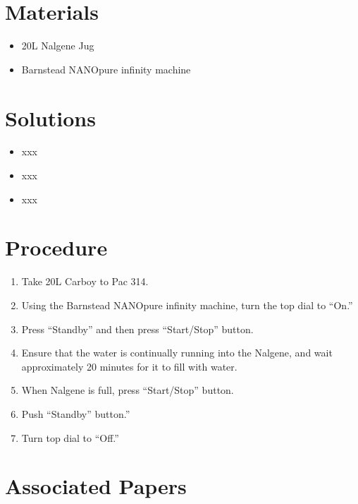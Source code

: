 \documentclass[
  letterpaper,
  DIV=11,
  numbers=noendperiod]{scrreprt}
\providecommand{\tightlist}{%
  \setlength{\itemsep}{0pt}\setlength{\parskip}{0pt}}\usepackage{longtable,booktabs,array}
\begin{document}
\hypertarget{materials-7}{%
\section{Materials}\label{materials-7}}

\begin{itemize}
\tightlist
\item
  20L Nalgene Jug
\item
  Barnstead NANOpure infinity machine
\end{itemize}

\hypertarget{solutions-7}{%
\section{Solutions}\label{solutions-7}}

\begin{itemize}
\tightlist
\item
  xxx
\item
  xxx
\item
  xxx
\end{itemize}

\hypertarget{procedure-7}{%
\section{Procedure}\label{procedure-7}}

\begin{enumerate}
\def\labelenumi{\arabic{enumi}.}
\item
  Take 20L Carboy to Pac 314.
\item
  Using the Barnstead NANOpure infinity machine, turn the top dial to
  ``On.''
\item
  Press ``Standby'' and then press ``Start/Stop'' button.
\item
  Ensure that the water is continually running into the Nalgene, and
  wait approximately 20 minutes for it to fill with water.
\item
  When Nalgene is full, press ``Start/Stop'' button.
\item
  Push ``Standby'' button.''
\item
  Turn top dial to ``Off.''
\end{enumerate}

\hypertarget{associated-papers-7}{%
\section{Associated Papers}\label{associated-papers-7}}
\end{document}
